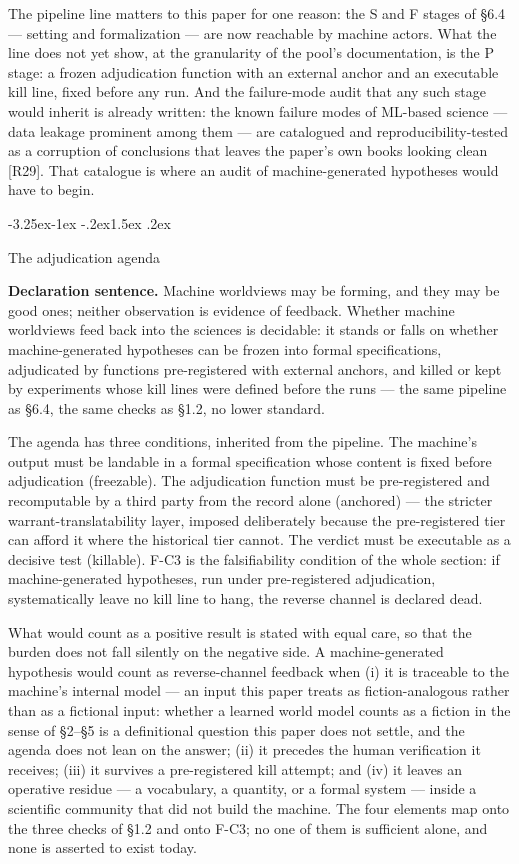 \documentclass[11pt,a4paper]{article}
\makeatletter
\renewcommand\subsection{\@startsection{subsection}{2}{\z@}%
  {-3.25ex\@plus -1ex \@minus -.2ex}{1.5ex \@plus .2ex}%
  {\normalfont\large\bfseries\raggedright}}
\makeatother
\begin{document}
The pipeline line matters to this paper for one reason: the S and F stages of §6.4 — setting and formalization — are now reachable by machine actors. What the line does not yet show, at the granularity of the pool's documentation, is the P stage: a frozen adjudication function with an external anchor and an executable kill line, fixed before any run. And the failure-mode audit that any such stage would inherit is already written: the known failure modes of ML-based science — data leakage prominent among them — are catalogued and reproducibility-tested as a corruption of conclusions that leaves the paper's own books looking clean [R29]. That catalogue is where an audit of machine-generated hypotheses would have to begin.

\subsection{The adjudication agenda}

\textbf{Declaration sentence.} Machine worldviews may be forming, and they may be good ones; neither observation is evidence of feedback. Whether machine worldviews feed back into the sciences is decidable: it stands or falls on whether machine-generated hypotheses can be frozen into formal specifications, adjudicated by functions pre-registered with external anchors, and killed or kept by experiments whose kill lines were defined before the runs — the same pipeline as §6.4, the same checks as §1.2, no lower standard.

The agenda has three conditions, inherited from the pipeline. The machine's output must be landable in a formal specification whose content is fixed before adjudication (freezable). The adjudication function must be pre-registered and recomputable by a third party from the record alone (anchored) — the stricter warrant-translatability layer, imposed deliberately because the pre-registered tier can afford it where the historical tier cannot. The verdict must be executable as a decisive test (killable). F-C3 is the falsifiability condition of the whole section: if machine-generated hypotheses, run under pre-registered adjudication, systematically leave no kill line to hang, the reverse channel is declared dead.

What would count as a positive result is stated with equal care, so that the burden does not fall silently on the negative side. A machine-generated hypothesis would count as reverse-channel feedback when (i) it is traceable to the machine's internal model — an input this paper treats as fiction-analogous rather than as a fictional input: whether a learned world model counts as a fiction in the sense of §2–§5 is a definitional question this paper does not settle, and the agenda does not lean on the answer; (ii) it precedes the human verification it receives; (iii) it survives a pre-registered kill attempt; and (iv) it leaves an operative residue — a vocabulary, a quantity, or a formal system — inside a scientific community that did not build the machine. The four elements map onto the three checks of §1.2 and onto F-C3; no one of them is sufficient alone, and none is asserted to exist today.
\end{document}
